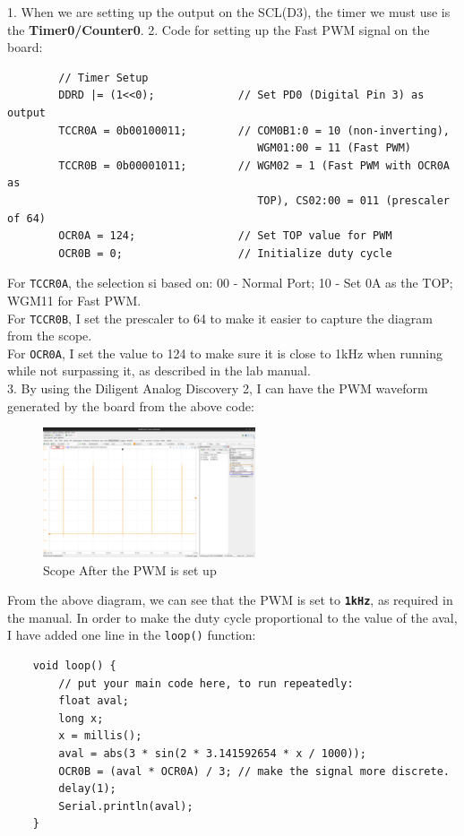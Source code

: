 \documentclass{report}
\begin{document}
    \begin{minipage}{\textwidth}
       1. When we are setting up the output on the SCL(D3), the timer we must use is the \textbf{Timer0/Counter0}. 
       2. Code for setting up the Fast PWM signal on the board:
       \begin{verbatim}
        // Timer Setup
        DDRD |= (1<<0);             // Set PD0 (Digital Pin 3) as output
        TCCR0A = 0b00100011;        // COM0B1:0 = 10 (non-inverting), 
                                       WGM01:00 = 11 (Fast PWM)
        TCCR0B = 0b00001011;        // WGM02 = 1 (Fast PWM with OCR0A as 
                                       TOP), CS02:00 = 011 (prescaler of 64)
        OCR0A = 124;                // Set TOP value for PWM
        OCR0B = 0;                  // Initialize duty cycle
       \end{verbatim}
       For \texttt{TCCR0A}, the selection si based on: 00 - Normal Port; 10 - Set 0A as the TOP; WGM11 for Fast PWM.\\
       For \texttt{TCCR0B}, I set the prescaler to 64 to make it easier to capture the diagram from the scope. \\
       For \texttt{OCR0A}, I set the value to 124 to make sure it is close to 1kHz when running while not surpassing it, as described in the lab manual.\\
       3. By using the Diligent Analog Discovery 2, I can have the PWM waveform generated by the board from the above code:
    \end{minipage}
    \begin{figure}[H]
        \centering 
        \includegraphics[width = 0.56\textwidth]{scope1.png}
        \caption{Scope After the PWM is set up}
   \end{figure}
   From the above diagram, we can see that the PWM is set to \textbf{\texttt{1kHz}}, as required in the manual. In order to make the duty cycle proportional to the value of the aval, I have added one line in the \texttt{loop()} function:
   \begin{verbatim}
    void loop() {
        // put your main code here, to run repeatedly:
        float aval;
        long x;
        x = millis();
        aval = abs(3 * sin(2 * 3.141592654 * x / 1000));
        OCR0B = (aval * OCR0A) / 3; // make the signal more discrete. 
        delay(1);
        Serial.println(aval);
    }
   \end{verbatim}
\end{document}
